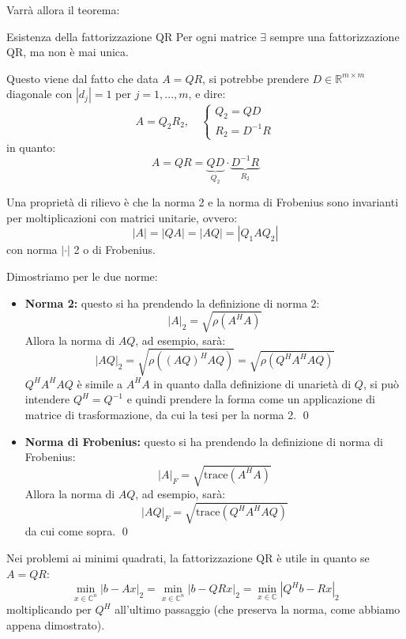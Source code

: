 \documentclass[a4paper,11pt]{article}
\begin{document}
Varrà allora il teorema:
\begin{theorem}{Esistenza della fattorizzazione QR}
	Per ogni matrice $\exists$ sempre una fattorizzazione QR, ma non è mai unica.
\end{theorem}

Questo viene dal fatto che data $A = QR$, si potrebbe prendere $D \in \mathbb{R}^{m \times m}$ diagonale con $|d_j| = 1$ per $j = 1, ..., m$, e dire:
$$
A = Q_2 R_2, \quad
	\begin{cases}
		Q_2 = QD \\
		R_2 = D^{-1} R
	\end{cases}
$$
in quanto:
$$
A = QR =  \underbrace{QD}_{Q_2} \cdot \underbrace{D^{-1}R}_{R_2}
$$

\par\smallskip

Una proprietà di rilievo è che la norma 2 e la norma di Frobenius sono invarianti per moltiplicazioni con matrici unitarie, ovvero:
$$
|A| = |QA| = |AQ| = |Q_1 A Q_2|
$$
con norma $|\cdot |$ 2 o di Frobenius.

Dimostriamo per le due norme:
\begin{itemize}
	\item \textbf{Norma 2:} 
questo si ha prendendo la definizione di norma 2:
$$
|A|_2 = \sqrt{\rho(A^H A)}
$$
Allora la norma di $AQ$, ad esempio, sarà:
$$
|AQ|_2 = \sqrt{\rho( (AQ)^H AQ )} = \sqrt{\rho(Q^H A^H A Q)}
$$
$Q^H A^H A Q$ è simile a $A^H A$ in quanto dalla definizione di unarietà di $Q$, si può intendere $Q^H = Q^{-1}$ e quindi prendere la forma come un applicazione di matrice di trasformazione, da cui la tesi per la norma 2. \qed

	\item \textbf{Norma di Frobenius:}
questo si ha prendendo la definizione di norma di Frobenius:
$$
|A|_F = \sqrt{\mathrm{trace}(A^H A)}
$$
Allora la norma di $AQ$, ad esempio, sarà:
$$
|AQ|_F = \sqrt{\mathrm{trace}(Q^H A^H A Q)} 
$$
da cui come sopra. \qed
\end{itemize}

\par\smallskip

Nei problemi ai minimi quadrati, la fattorizzazione QR è utile in quanto se $A = QR$:
$$
\min_{x \in \mathbb{C}^n} | b - Ax |_2 = \min_{x \in \mathbb{C}^n} |b - QR x|_2 = \min_{x \in \mathbb{C}} |Q^H b - Rx|_2
$$
moltiplicando per $Q^H$ all'ultimo passaggio (che preserva la norma, come abbiamo appena dimostrato).
\end{document}
